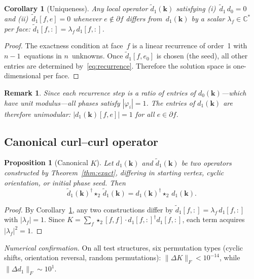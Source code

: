 \documentclass[preprint,12pt]{elsarticle}
\newtheorem{proposition}{Proposition}
\newtheorem{corollary}{Corollary}
\newtheorem{remark}{Remark}
\begin{document}
\begin{corollary}[Uniqueness]\label{cor:unique}
Any local operator $\tilde{d}_1(\mathbf{k})$ satisfying (i)~$\tilde{d}_1\,d_0 = 0$ and (ii)~$\tilde{d}_1[f,e] = 0$ whenever $e \notin \partial f$ differs from~$d_1(\mathbf{k})$ by a scalar $\lambda_f \in \mathbb{C}^*$ per face: $\tilde{d}_1[f,:] = \lambda_f\,d_1[f,:]$.
\end{corollary}

\begin{proof}
The exactness condition at face~$f$ is a linear recurrence of order~1 with $n-1$~equations in $n$~unknowns. Once $\tilde{d}_1[f, e_0]$ is chosen (the seed), all other entries are determined by~\eqref{eq:recurrence}. Therefore the solution space is one-dimensional per face.
\end{proof}

\begin{remark}
Since each recurrence step is a ratio of entries of $d_0(\mathbf{k})$---which have unit modulus---all phases satisfy $|\varphi_i| = 1$. The entries of $d_1(\mathbf{k})$ are therefore unimodular: $|d_1(\mathbf{k})[f,e]| = 1$ for all $e \in \partial f$.
\end{remark}

\subsection{Canonical curl--curl operator}

\begin{proposition}[Canonical $K$]\label{prop:canonical}
Let $d_1(\mathbf{k})$ and $\tilde{d}_1(\mathbf{k})$ be two operators constructed by Theorem~\ref{thm:exact}, differing in starting vertex, cyclic orientation, or initial phase seed. Then
\begin{equation}
  \tilde{d}_1(\mathbf{k})^\dagger \star_2\, \tilde{d}_1(\mathbf{k}) = d_1(\mathbf{k})^\dagger \star_2\, d_1(\mathbf{k}).
\end{equation}
\end{proposition}

\begin{proof}
By Corollary~\ref{cor:unique}, any two constructions differ by $\tilde{d}_1[f,:] = \lambda_f\,d_1[f,:]$ with $|\lambda_f| = 1$. Since $K = \sum_f \star_2[f,f]\cdot d_1[f,:]^\dagger d_1[f,:]$, each term acquires $|\lambda_f|^2 = 1$.
\end{proof}

\emph{Numerical confirmation.} On all test structures, six permutation types (cyclic shifts, orientation reversal, random permutations): $\|\Delta K\|_F < 10^{-14}$, while $\|\Delta d_1\|_F \sim 10^{1}$.
\end{document}
